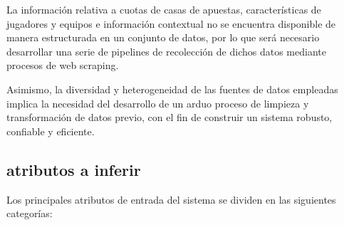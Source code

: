 La información relativa a cuotas de casas de apuestas, características de jugadores y equipos e información contextual no se encuentra disponible de manera estructurada en un conjunto de datos, por lo que será necesario desarrollar una serie de pipelines de recolección de dichos datos mediante procesos de web scraping. 

Asimismo, la diversidad y heterogeneidad de las fuentes de datos empleadas implica la necesidad del desarrollo de un arduo proceso de limpieza y transformación de datos previo, con el fin de construir un sistema robusto, confiable y eficiente. 

\subsection{atributos a inferir}


Los principales atributos de entrada del sistema se dividen en las siguientes categorías:

